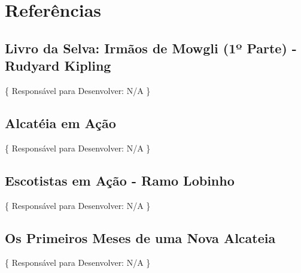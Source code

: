 \chapter[Referências]{Referências}
\label{chap:referencias}
	\section[Livro da Selva: Irmãos de Mowgli (1º Parte) - Rudyard Kipling]{Livro da Selva: Irmãos de Mowgli (1º Parte) - Rudyard Kipling}
	\label{sec:referencias_livroDaSelva}
		\{ Responsável para Desenvolver: N/A \}

	\section[Alcatéia em Ação]{Alcatéia em Ação}
	\label{sec:referencias_alcateiaEmAcao}
		\{ Responsável para Desenvolver: N/A \}

	\section[Escotistas em Ação - Ramo Lobinho]{Escotistas em Ação - Ramo Lobinho}
	\label{sec:referencias_escotistasEmAcaoRamoLobinho}
		\{ Responsável para Desenvolver: N/A \}

	\section[Os Primeiros Meses de uma Nova Alcateia]{Os Primeiros Meses de uma Nova Alcateia}
	\label{sec:referencias_alcateiaEmAcao}
		\{ Responsável para Desenvolver: N/A \}